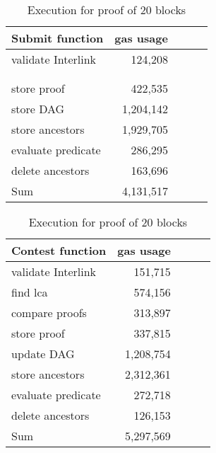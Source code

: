 \begin{table}[H]
    \centering
    \begin{tabular}{@{}lccll@{}}
        \toprule
        \multicolumn{1}{c}{\textbf{Submit function}} & \textbf{gas usage}    \\ \midrule
        validate Interlink  & \multicolumn{1}{r}{124,208} \\
        \\
        \\
        store proof         & \multicolumn{1}{r}{  422,535} \\
        store DAG           & \multicolumn{1}{r}{1,204,142}\\
        store ancestors     & \multicolumn{1}{r}{1,929,705}\\
        evaluate predicate  & \multicolumn{1}{r}{  286,295} \\
        delete ancestors    & \multicolumn{1}{r}{  163,696} \\
        \midrule
        Sum                 & \multicolumn{1}{r}{4,131,517} \\
        \bottomrule
    \end{tabular}
    \quad
    \begin{tabular}{@{}lccll@{}}
        \toprule
        \multicolumn{1}{c}{\textbf{Contest function}} & \textbf{gas usage}    \\ \midrule
        validate Interlink  & \multicolumn{1}{r}{  151,715} \\
        find lca            & \multicolumn{1}{r}{  574,156} \\
        compare proofs      & \multicolumn{1}{r}{  313,897} \\
        store proof         & \multicolumn{1}{r}{  337,815} \\
        update DAG          & \multicolumn{1}{r}{1,208,754} \\
        store ancestors     & \multicolumn{1}{r}{2,312,361} \\
        evaluate predicate  & \multicolumn{1}{r}{  272,718} \\
        delete ancestors    & \multicolumn{1}{r}{  126,153} \\
        \midrule
        Sum                 & \multicolumn{1}{r}{5,297,569} \\
        \bottomrule
    \end{tabular}
    \caption{Execution for proof of 20 blocks}
    \label{table:old_gas_usage}
\end{table}
